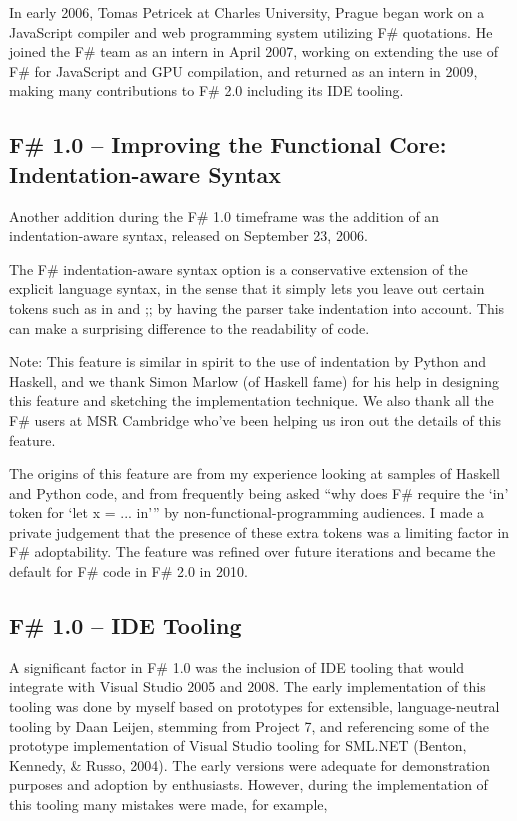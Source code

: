 \documentclass[acmsmall,review]{acmart}\settopmatter{printfolios=true,printccs=false,printacmref=false}
\begin{document}
In early 2006, Tomas Petricek at Charles University, Prague began work on a JavaScript compiler and web programming system utilizing F\# quotations.   He joined the F\# team as an intern in April 2007, working on extending the use of F\# for JavaScript and GPU compilation, and returned as an intern in 2009, making many contributions to F\# 2.0 including its IDE tooling.

\subsection*{F\# 1.0 – Improving the Functional Core: Indentation-aware Syntax}

Another addition during the F\# 1.0 timeframe was the addition of an indentation-aware syntax, released on September 23, 2006.   

\begin{verbquote}
The F\# indentation-aware syntax option is a conservative extension of the explicit language syntax, in the sense that it simply lets you leave out certain tokens such as in and ;; by having the parser take indentation into account. This can make a surprising difference to the readability of code. 

Note: This feature is similar in spirit to the use of indentation by Python and Haskell, and we thank Simon Marlow (of Haskell fame) for his help in designing this feature and sketching the implementation technique. We also thank all the F\# users at MSR Cambridge who've been helping us iron out the details of this feature. 
\end{verbquote}

The origins of this feature are from my experience looking at samples of Haskell and Python code, and from frequently being asked “why does F\# require the ‘in’ token for ‘let x = ... in’” by non-functional-programming audiences.  I made a private judgement that the presence of these extra tokens was a limiting factor in F\# adoptability.  The feature was refined over future iterations and became the default for F\# code in F\# 2.0 in 2010.

\subsection*{F\# 1.0 – IDE Tooling}

A significant factor in F\# 1.0 was the inclusion of IDE tooling that would integrate with Visual Studio 2005 and 2008. The early implementation of this tooling was done by myself based on prototypes for extensible, language-neutral tooling by Daan Leijen, stemming from Project 7, and referencing some of the prototype implementation of Visual Studio tooling for SML.NET (Benton, Kennedy, \& Russo, 2004). The early versions were adequate for demonstration purposes and adoption by enthusiasts.  However, during the implementation of this tooling many mistakes were made, for example, 
\end{document}
